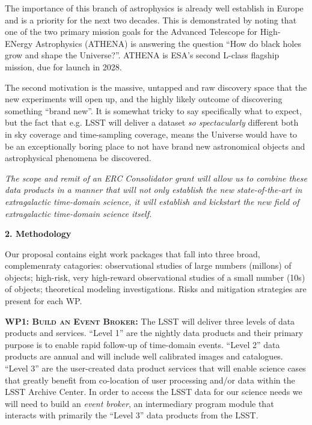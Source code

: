 \documentclass[oneside, a4paper, onecolumn, 11pt]{article}
\begin{document}
\noindent
The importance of this branch of astrophysics is already well
establish in Europe and is a priority for the next two decades. This
is demonstrated by noting that one of the two primary mission goals
for the Advanced Telescope for High-ENergy Astrophysics (ATHENA) is
answering the question ``How do black holes grow and shape the
Universe?''.  ATHENA is ESA's second L-class flagship mission, due for
launch in 2028.

\noindent
The second motivation is the massive, untapped and raw discovery space
that the new experiments will open up, and the highly likely outcome
of discovering something ``brand new''. It is somewhat tricky to say
specifically what to expect, but the fact that e.g. LSST will deliver
a dataset {\it so spectacularly} different both in sky coverage and
time-sampling coverage, means the Universe would have to be an
exceptionally boring place to not have brand new astronomical objects
and astrophysical phenomena be discovered.

\smallskip
\smallskip
\noindent
{\it The scope and
remit of an ERC Consolidator grant will allow us to combine these data
products in a manner that will not only establish the new
state-of-the-art in extragalactic time-domain science, it will
establish and kickstart the new field of extragalactic time-domain 
science itself.}





\medskip
\medskip
\noindent
\large
{\bf{\textcolor{Cerulean}{2. Methodology}}}
\normalsize

\noindent
Our proposal contains eight work packages that fall into three broad, 
complemenraty catagories: observational studies of large numbers (millons) 
of objects; high-risk, very high-reward observational studies of a small number 
(10s) of objects; theoretical modeling investigations. Risks and mitigation strategies are
present for each WP. 


\smallskip
\smallskip
\noindent
\textbf{\textsc{WP1: Build an Event Broker:}} 
The LSST will deliver three levels of data products and
services. ``Level 1'' are the nightly data products and their primary
purpose is to enable rapid follow-up of time-domain events. ``Level
2'' data products are annual and will include well calibrated images
and catalogues. ``Level 3'' are the user-created data product services
that will enable science cases that greatly benefit from co-location
of user processing and/or data within the LSST Archive Center. In
order to access the LSST data for our science needs we will need to
build an {\it event broker}, an intermediary program module that
interacts with primarily the ``Level 3'' data products from the LSST.
\end{document}
